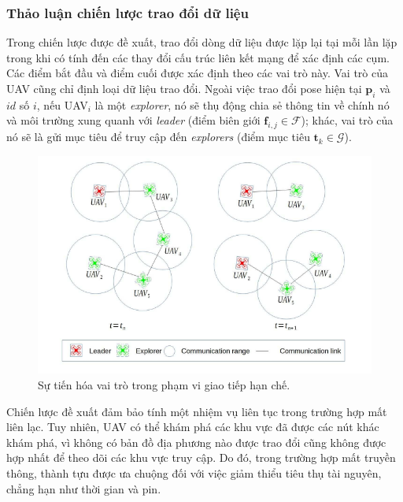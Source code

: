 \documentclass[11pt,openany]{book}
\begin{document}
\subsubsection{Thảo luận chiến lược trao đổi dữ liệu}
Trong chiến lược được đề xuất, trao đổi dòng dữ liệu được lặp lại tại mỗi lần lặp trong khi có tính đến các thay đổi cấu trúc liên kết mạng để xác định các cụm. Các điểm bắt đầu và điểm cuối được xác định theo các vai trò này. Vai trò của UAV cũng chỉ định loại dữ liệu trao đổi. Ngoài việc trao đổi pose hiện tại $\mathbf{p}_i$ và $id$ số $i$, nếu UAV$_i$ là một \textit{explorer}, nó sẽ thụ động chia sẻ thông tin về chính nó và môi trường xung quanh với \textit{leader} (điểm biên giới $\mathbf{f}_{i,j} \in \mathcal{F}$); khác, vai trò của nó sẽ là gửi mục tiêu để truy cập đến \textit{explorers} (điểm mục tiêu $\mathbf{t}_k \in \mathcal{G}$).
\begin{figure}[H]
    \centering
    \includegraphics[scale=0.4]{assets/4_6.png}
    \caption{Sự tiến hóa vai trò trong phạm vi giao tiếp hạn chế.}
    \label{fig:4.6}
\end{figure}
Chiến lược đề xuất đảm bảo tính một nhiệm vụ liên tục trong trường hợp mất liên lạc. Tuy nhiên, UAV có thể khám phá các khu vực đã được các nút khác khám phá, vì không có bản đồ địa phương nào được trao đổi cũng không được hợp nhất để theo dõi các khu vực truy cập. Do đó, trong trường hợp mất truyền thông, thành tựu được ưa chuộng đối với việc giảm thiểu tiêu thụ tài nguyên, chẳng hạn như thời gian và pin.
\end{document}
